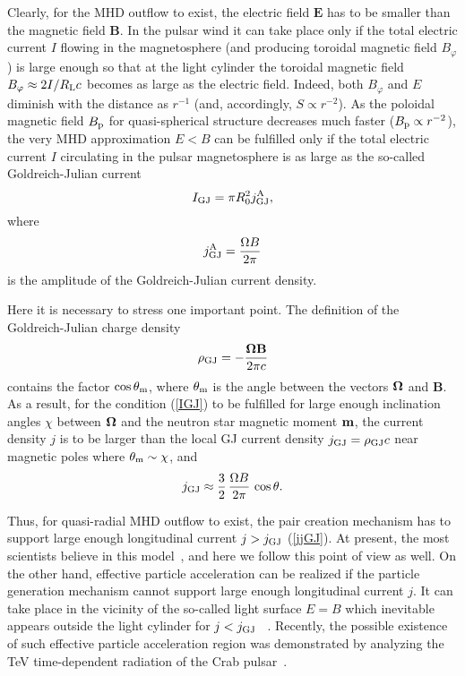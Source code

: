 \documentclass[useAMS,usenatbib]{mn2e}
\begin{document}
Clearly, for the MHD outflow to exist, the electric field ${\boldsymbol E}$ has to be smaller
 than the magnetic field ${\boldsymbol B}$. In the pulsar wind it can take place only if the
total electric current $I$ flowing in the magnetosphere (and producing toroidal
magnetic field $B_{\varphi}$) is large enough so that at the light cylinder the
toroidal magnetic field $B_{\varphi} \approx 2I/R_{\rm L}c$ becomes as large
as the electric field. Indeed, both $B_{\varphi}$ and $E$ diminish with
the distance as $r^{-1}$ (and, accordingly, $S \propto r^{-2}$). As the poloidal
magnetic field $B_{\rm p}$ for quasi-spherical structure decreases much faster
($B_{\rm p} \propto r^{-2}$), the very MHD approximation $E < B$ can be fulfilled
only if the total electric current  $I$ circulating in the pulsar magnetosphere is
as large as the so-called Goldreich-Julian current
\begin{equation}
I_{\rm GJ} = \pi R_{0}^2 j_{\rm GJ}^{\rm A},
\label{IGJ}
\end{equation}
where
\begin{equation}
j_{\rm GJ}^{\rm A} = \frac{\Omega B}{2 \pi}
\label{jGJA}
\end{equation}
is the amplitude of the Goldreich-Julian current density.

Here it is necessary to stress one important point. The definition of the Goldreich-Julian
charge density
\begin{equation}
\rho_{\rm GJ} = -\frac{\bf{\Omega} {\boldsymbol B}}{2 \pi c}
\label{rhoGJ}
\end{equation}
contains the factor $\cos \theta_{\rm m}$, where $\theta_{\rm m}$
is the angle between the vectors ${\bf \Omega}$ and ${\boldsymbol B}$. As a result,
for the condition (\ref{IGJ}) to be fulfilled for large enough inclination
angles $\chi$ between ${\bf \Omega}$ and the neutron star magnetic moment
${\bf m}$, the current density $j$ is to be larger than the local GJ current
density $j_{\rm GJ} = \rho_{\rm GJ} c$ near magnetic poles where 
$\theta_{\rm m} \sim \chi $, and
\begin{equation}
j_{\rm GJ} \approx \frac{3}{2} \, \frac{\Omega B}{2 \pi} \, \cos\theta.
\label{jjGJ}
\end{equation}

Thus, for quasi-radial MHD outflow to exist, the pair creation mechanism
has to support large enough longitudinal current $j > j_{\rm GJ}$ (\ref{jjGJ}).
At present, the most scientists believe in this model~\citep[see, e.g.,][]{2013MNRAS.429...20T},
and here we follow this point of view as well. On the other hand, effective
particle acceleration can be realized if the particle generation mechanism
cannot support large enough longitudinal current $j$. It can take place
in the vicinity of the so-called light surface $E = B$ which inevitable
appears outside the light cylinder for $j < j_{\rm GJ}$ ~\citep{BGI, 2000MNRAS.313..433B}.
Recently, the possible existence of such effective particle acceleration region was demonstrated by 
analyzing the TeV time-dependent radiation of the Crab pulsar~\citep{2012Natur.482..507A}.
\end{document}
